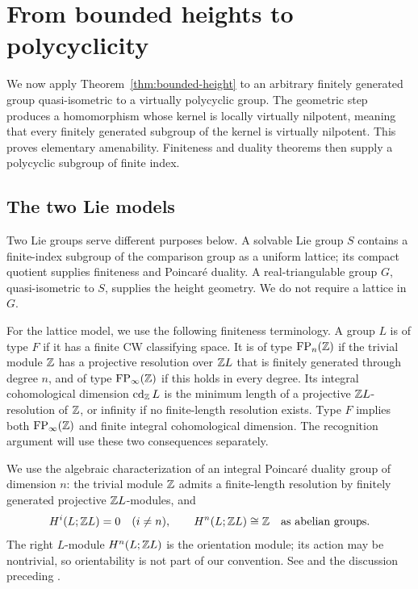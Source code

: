 \section{From bounded heights to polycyclicity}
\label{sec:recognition}

We now apply Theorem~\ref{thm:bounded-height} to an arbitrary finitely
generated group quasi-isometric to a virtually polycyclic group.  The
geometric step produces a homomorphism whose kernel is locally virtually
nilpotent, meaning that every finitely generated subgroup of the kernel is
virtually nilpotent.  This proves elementary amenability.  Finiteness and
duality theorems then supply a polycyclic subgroup of finite index.

\subsection{The two Lie models}

Two Lie groups serve different purposes below.  A solvable Lie group $S$
contains a finite-index subgroup of the comparison group as a uniform
lattice; its compact quotient supplies finiteness and Poincar\'e duality.
A real-triangulable group $G$, quasi-isometric to $S$, supplies the height
geometry.  We do not require a lattice in $G$.

For the lattice model, we use the following finiteness terminology.
A group $L$ is of type $F$ if it has a finite CW classifying space.
It is of type $\mathrm{FP}_n(\mathbb Z)$ if the trivial module $\mathbb Z$ has a projective resolution over $\mathbb Z L$ that is
finitely generated through degree $n$, and of type $\mathrm{FP}_\infty(\mathbb Z)$ if
this holds in every degree.  Its integral cohomological dimension
$\operatorname{cd}_{\mathbb Z}L$ is the minimum length of a projective
$\mathbb Z L$-resolution of $\mathbb Z$, or infinity if no finite-length resolution
exists.  Type $F$ implies both $\mathrm{FP}_\infty(\mathbb Z)$ and finite integral
cohomological dimension.  The recognition argument will use these two
consequences separately.

We use the algebraic characterization of an integral Poincar\'e duality
group of dimension $n$: the trivial module $\mathbb Z$ admits a finite-length
resolution by finitely generated projective $\mathbb Z L$-modules, and
\[
 H^i(L;\mathbb Z L)=0\quad(i\ne n),
 \qquad H^n(L;\mathbb Z L)\cong\mathbb Z\quad\text{as abelian groups}.
\]
The right $L$-module $H^n(L;\mathbb Z L)$ is the orientation module; its action
may be nontrivial, so orientability is not part of our convention.
See \cite[Theorem~9.2 and Section~9.10]{Bieri1981} and the discussion preceding
\cite[Corollary~4.48]{Li2018}.

